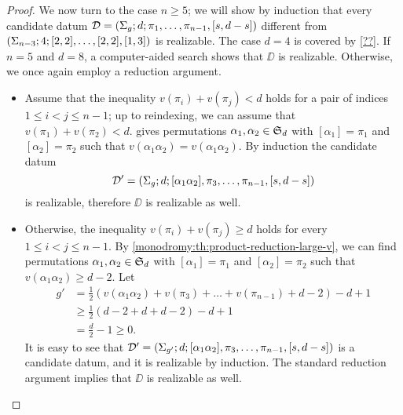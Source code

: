 \begin{proof}
We now turn to the case $n\ge 5$; we will show by induction that every candidate datum $\mathcal{D}=(\Sigma_{g};d;\pi_1,\ldots,\pi_{n-1},[s,d-s])$  different from $(\Sigma_{n-3};4;[2,2],\ldots,[2,2],[1,3])$ is realizable. The case $d=4$ is covered by \cref{??}. If $n=5$ and $d=8$, a computer-aided search shows that $\DD$ is realizable. Otherwise, we once again employ a reduction argument.
\begin{itemize}
\item Assume that the inequality $v(\pi_i)+v(\pi_j)<d$ holds for a pair of indices $1\le i<j\le n-1$; up to reindexing, we can assume that $v(\pi_1)+v(\pi_2)<d$.  gives permutations $\alpha_1,\alpha_2\in\symgroup[d]$ with $[\alpha_1]=\pi_1$ and $[\alpha_2]=\pi_2$ such that $v(\alpha_1\alpha_2)=v(\alpha_1\alpha_2)$. By induction the candidate datum
\[
\mathcal{D}'=(\Sigma_{g};d;[\alpha_1\alpha_2],\pi_3,\ldots,\pi_{n-1},[s,d-s])
\]
is realizable, therefore $\DD$ is realizable as well.
\item Otherwise, the inequality $v(\pi_i)+v(\pi_j)\ge d$ holds for every $1\le i<j\le n-1$. By \cref{monodromy:th:product-reduction-large-v}, we can find permutations $\alpha_1,\alpha_2\in\symgroup[d]$ with $[\alpha_1]=\pi_1$ and $[\alpha_2]=\pi_2$ such that $v(\alpha_1\alpha_2)\ge d-2$. Let
\begin{align*}
g'&=\frac{1}{2}(v(\alpha_1\alpha_2)+v(\pi_3)+\ldots+v(\pi_{n-1})+d-2)-d+1\\
&\ge\frac{1}{2}(d-2+d+d-2)-d+1\\
&=\frac{d}{2}-1\ge 0.
\end{align*}
It is easy to see that $\mathcal{D}'=(\Sigma_{g'};d;[\alpha_1\alpha_2],\pi_3,\ldots,\pi_{n-1},[s,d-s])$ is a candidate datum, and it is realizable by induction. The standard reduction argument implies that $\DD$ is realizable as well.
\end{itemize}
\end{proof}